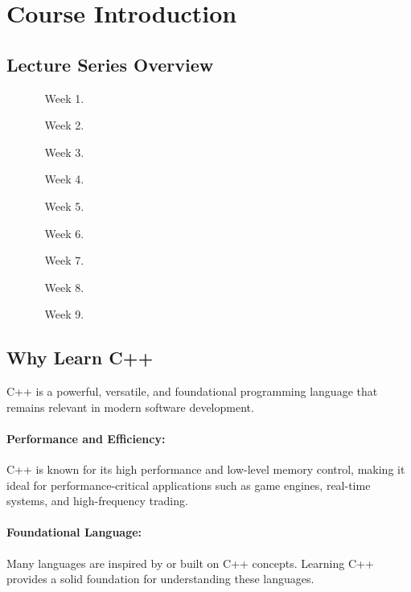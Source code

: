 \documentclass{article}
\title{\thistitle}
\author{\me}
\date{\today}
\begin{document}
\maketitle
\tableofcontents

\section{Course Introduction}

\subsection{Lecture Series Overview}

\begin{enumerate}
\item[]
\begin{enumerate}
	\item[Week 1.] \titleone
	\item[Week 2.] \titletwo
	\item[Week 3.] \titlethree
	\item[Week 4.] \titlefour
	\item[Week 5.] \titlefive
	\item[Week 6.] \titlesix
	\item[Week 7.] \titleseven
	\item[Week 8.] \titleeight
	\item[Week 9.] \titlenine
\end{enumerate}
\end{enumerate}

\subsection{Why Learn C++}

\noindent
C++ is a powerful, versatile, and foundational programming language that remains relevant in modern software development.

\paragraph{Performance and Efficiency:}
C++ is known for its high performance and low-level memory control, making it ideal for performance-critical applications such as game engines, real-time systems, and high-frequency trading.

\paragraph{Foundational Language:}
Many languages are inspired by or built on C++ concepts. Learning C++ provides a solid foundation for understanding these languages.
\end{document}
